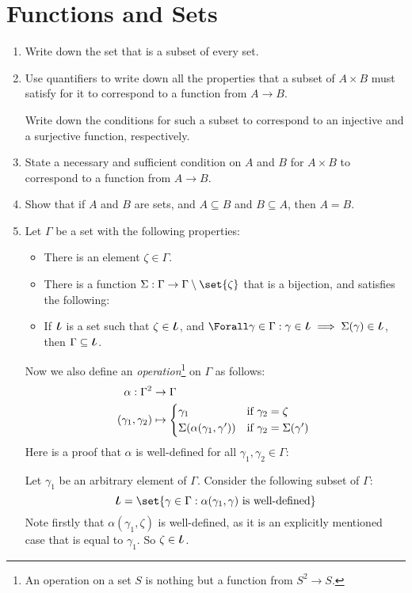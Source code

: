 \section{Functions and Sets}

\begin{enumerate}
 \item
  Write down the set that is a subset of every set.
 \item
  Use quantifiers to write down all the properties that a subset of
  \(A \times B\) must satisfy for it to correspond to a function from
  \(A \to B\).

  Write down the conditions for such a subset to correspond to an injective and
  a surjective function, respectively.
 \item
  State a necessary and sufficient condition on \(A\) and \(B\) for
  \(A \times B\) to correspond to a function from \(A \to B\).
 \item
  Show that if \(A\) and \(B\) are sets, and \(A \subseteq B\) and
  \(B \subseteq A\), then \(A = B\).
 \item
  Let \(\Gamma\) be a set with the following properties:
  \begin{itemize}
   \item
    There is an element \(\zeta \in \Gamma\).
   \item
    There is a function \(\Sigma: \Gamma \to \Gamma \setminus \set{\zeta}\) that
    is a bijection, and satisfies the following:
   \item
    If \(\BigIota\) is a set such that \(\zeta \in \BigIota\), and
    \(\Forall \gamma \in \Gamma :
      \gamma \in \BigIota
      \implies \Sigma(\gamma) \in \BigIota\),
    then \(\Gamma \subseteq \BigIota\).
  \end{itemize}
  Now we also define an \emph{operation}\footnote{
   An operation on a set \(S\) is nothing but a function from \(S^2 \to S\).
  } on \(\Gamma\) as follows:
  \begin{align*}
   \alpha: \Gamma^2 &\to \Gamma \\
   (\gamma_1, \gamma_2) &\mapsto
   \begin{cases*}
    \gamma_1 & if \(\gamma_2 = \zeta\) \\
    \Sigma(\alpha(\gamma_1, \gamma')) & if \(\gamma_2 = \Sigma(\gamma')\)
   \end{cases*}
  \end{align*}
  Here is a proof that \(\alpha\) is well-defined for all
  \(\gamma_1, \gamma_2 \in \Gamma\):
  \begin{tcolorbox}
   Let \(\gamma_1\) be an arbitrary element of \(\Gamma\). Consider the
   following subset of \(\Gamma\):
   \begin{equation*}
    \BigIota
    = \set{\gamma \in \Gamma :
    \text{\(\alpha(\gamma_1, \gamma)\) is well-defined}}
   \end{equation*}
   Note firstly that \(\alpha(\gamma_1, \zeta)\) is well-defined, as it is an
   explicitly mentioned case that is equal to \(\gamma_1\). So
   \(\zeta \in \BigIota\).


\end{tcolorbox}
\end{enumerate}
